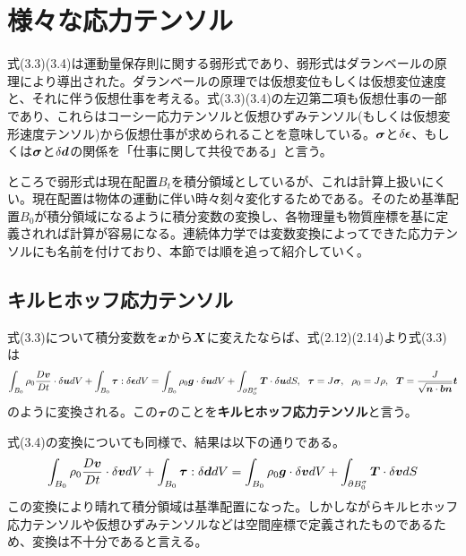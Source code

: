 \documentclass[dvipdfmx, 9pt, a4paper]{jsarticle}
\numberwithin{equation}{section}
\newcommand{\bm}[1]{{\mbox{\boldmath $#1$}}}
\begin{document}
\section{様々な応力テンソル}
式(3.3)(3.4)は運動量保存則に関する弱形式であり、弱形式はダランベールの原理により導出された。ダランベールの原理では仮想変位もしくは仮想変位速度と、それに伴う仮想仕事を考える。式(3.3)(3.4)の左辺第二項も仮想仕事の一部であり、これらはコーシー応力テンソルと仮想ひずみテンソル(もしくは仮想変形速度テンソル)から仮想仕事が求められることを意味している。$\bm \sigma$と$\delta \bm \epsilon$、もしくは$\bm \sigma$と$\delta \bm d$の関係を「仕事に関して共役である」と言う。\par
ところで弱形式は現在配置$B_t$を積分領域としているが、これは計算上扱いにくい。現在配置は物体の運動に伴い時々刻々変化するためである。そのため基準配置$B_0$が積分領域になるように積分変数の変換し、各物理量も物質座標を基に定義されれば計算が容易になる。連続体力学では変数変換によってできた応力テンソルにも名前を付けており、本節では順を追って紹介していく。
\subsection{キルヒホッフ応力テンソル}
式(3.3)について積分変数を$\bm x$から$\bm X$に変えたならば、式(2.12)(2.14)より式(3.3)は
\begin{equation}
\int_{B_0} \rho_0\frac{D\bm v}{Dt}\cdot \delta \bm udV + \int_{B_0}\bm \tau : \delta \bm \epsilon dV=\int_{B_0}\rho_0\bm g\cdot \delta \bm udV+\int_{\partial B_0^\sigma}\bm T\cdot \delta \bm udS,~~\bm \tau=J\bm \sigma,~~\rho_0=J\rho,~~\bm T=\frac{J}{\sqrt{\bm n\cdot \bm b\bm n}}\bm t
\end{equation}
のように変換される。この$\bm \tau$のことを{\bf キルヒホッフ応力テンソル}と言う。\par
式(3.4)の変換についても同様で、結果は以下の通りである。
\begin{equation}
\int_{B_0} \rho_0\frac{D\bm v}{Dt}\cdot \delta \bm vdV + \int_{B_0}\bm \tau : \delta \bm d dV=\int_{B_0}\rho_0\bm g\cdot \delta \bm vdV+\int_{\partial B_0^\sigma}\bm T\cdot \delta \bm vdS
\end{equation}
この変換により晴れて積分領域は基準配置になった。しかしながらキルヒホッフ応力テンソルや仮想ひずみテンソルなどは空間座標で定義されたものであるため、変換は不十分であると言える。
\end{document}
